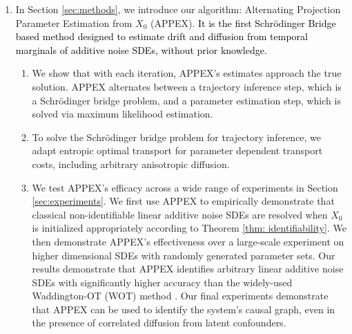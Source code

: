 \documentclass[twoside,11pt]{article}
\newcommand{\todo}[1]{\textbf{\textcolor{red}{TODO: #1}}}
\newcommand{\rv}[1]{\textcolor{black}{#1}}
\begin{document}
\begin{enumerate}
\begin{enumerate}
        \item In Section \ref{sec:causal_graph}, 
        we connect parameter estimation to causal structure learning via dynamic structural causal models \citep{boeken2024dynamic}. We show that the causal graph of any additive noise model can be recovered from the identified SDE parameters.
    \end{enumerate}
    \item In Section \ref{sec:methods}, we introduce our algorithm: Alternating Projection Parameter Estimation from $X_0$ (APPEX). \rv{It is the first Schr\"odinger Bridge based method designed to estimate drift and diffusion from temporal marginals of additive noise SDEs, without prior knowledge.}
    \begin{enumerate}
        \item We show that with each iteration, APPEX's estimates approach the true solution. APPEX alternates between a trajectory inference step, which is a Schr\"odinger bridge problem, and a parameter estimation step, which is solved via maximum likelihood estimation. 
        \item To solve the Schr\"odinger bridge problem for trajectory inference, we adapt entropic optimal transport for parameter dependent transport costs, including arbitrary anisotropic diffusion.
        \item We test APPEX's efficacy across a wide range of experiments in Section \ref{sec:experiments}. We first use APPEX to empirically demonstrate that classical non-identifiable linear additive noise SDEs are resolved when $X_0$ is initialized appropriately according to Theorem \ref{thm: identifiability}.
        We then demonstrate APPEX's effectiveness over a large-scale experiment on higher dimensional SDEs with randomly generated parameter sets. Our results demonstrate that APPEX identifies arbitrary linear additive noise SDEs with significantly higher accuracy than the widely-used Waddington-OT (WOT) method \citep{schiebinger2019optimal}. Our final experiments demonstrate that APPEX can be used to identify the system's causal graph, even in the presence of correlated diffusion from latent confounders.
    \end{enumerate}
\end{enumerate}
\end{document}
